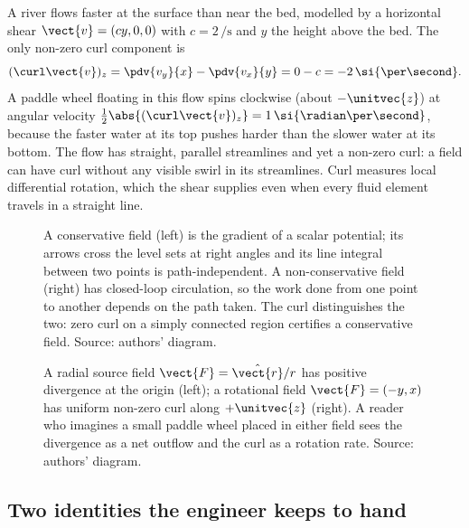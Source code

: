 \begin{example}
A river flows faster at the surface than near the bed, modelled by a
horizontal shear $\vect{v} = (cy, 0, 0)$ with $c = 2\,\si{\per
\second}$ and $y$ the height above the bed. The only non-zero curl
component is
\[
(\curl\vect{v})_{z} = \pdv{v_{y}}{x} - \pdv{v_{x}}{y} = 0 - c = -2\,
\si{\per\second}.
\]
A paddle wheel floating in this flow spins clockwise (about
$-\unitvec{z}$) at angular velocity $\tfrac{1}{2}\abs{(\curl
\vect{v})_{z}} = 1\,\si{\radian\per\second}$, because the faster water
at its top pushes harder than the slower water at its bottom. The
flow has straight, parallel streamlines and yet a non-zero curl: a
field can have curl without any visible swirl in its streamlines.
Curl measures local differential rotation, which the shear supplies
even when every fluid element travels in a straight line.
\end{example}

\begin{figure}[h]
  \centering
  
  \caption[Conservative versus non-conservative fields.]{A
  conservative field (left) is the gradient of a scalar potential; its
  arrows cross the level sets at right angles and its line integral
  between two points is path-independent. A non-conservative field
  (right) has closed-loop circulation, so the work done from one point
  to another depends on the path taken. The curl distinguishes the
  two: zero curl on a simply connected region certifies a conservative
  field. Source: authors' diagram.}
  \label{fig:vol02:ch08:conservative}
\end{figure}

\begin{figure}[h]
  \centering
  
  \caption[Divergence and curl in two model fields.]{A radial source
  field $\vect{F} = \hat{\vect{r}}/r$ has positive divergence at the
  origin (left); a rotational field $\vect{F} = (-y, x)$ has uniform
  non-zero curl along $+\unitvec{z}$ (right). A reader who imagines a
  small paddle wheel placed in either field sees the divergence as a
  net outflow and the curl as a rotation rate. Source: authors'
  diagram.}
  \label{fig:vol02:ch08:div-curl}
\end{figure}

\subsection{Two identities the engineer keeps to hand}

